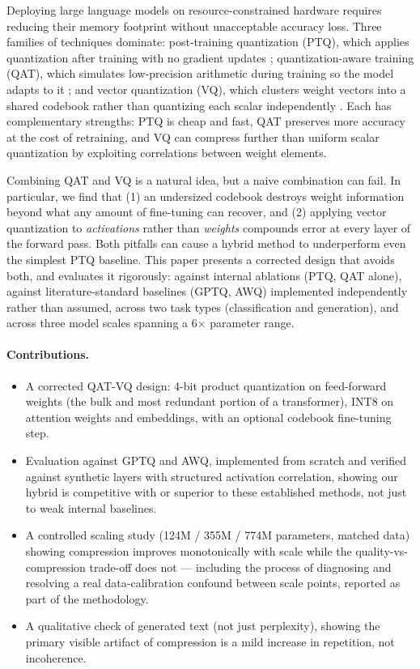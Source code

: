 \documentclass[11pt]{article}
\begin{document}
Deploying large language models on resource-constrained hardware requires
reducing their memory footprint without unacceptable accuracy loss. Three
families of techniques dominate: post-training quantization (PTQ), which
applies quantization after training with no gradient updates
\citep{dettmers2022bit8}; quantization-aware training (QAT), which
simulates low-precision arithmetic during training so the model adapts to
it \citep{zafrir2019q8bert}; and vector quantization (VQ), which clusters
weight vectors into a shared codebook rather than quantizing each scalar
independently \citep{gong2014compressing}. Each has complementary
strengths: PTQ is cheap and fast, QAT preserves more accuracy at the cost
of retraining, and VQ can compress further than uniform scalar
quantization by exploiting correlations between weight elements.

Combining QAT and VQ is a natural idea, but a naive combination can fail.
In particular, we find that (1) an undersized codebook destroys weight
information beyond what any amount of fine-tuning can recover, and (2)
applying vector quantization to \emph{activations} rather than
\emph{weights} compounds error at every layer of the forward pass. Both
pitfalls can cause a hybrid method to underperform even the simplest PTQ
baseline. This paper presents a corrected design that avoids both, and
evaluates it rigorously: against internal ablations (PTQ, QAT alone),
against literature-standard baselines (GPTQ, AWQ) implemented independently
rather than assumed, across two task types (classification and
generation), and across three model scales spanning a 6$\times$ parameter
range.

\paragraph{Contributions.}
\begin{itemize}
  \item A corrected QAT-VQ design: 4-bit product quantization on
    feed-forward weights (the bulk and most redundant portion of a
    transformer), INT8 on attention weights and embeddings, with an
    optional codebook fine-tuning step.
  \item Evaluation against GPTQ and AWQ, implemented from scratch and
    verified against synthetic layers with structured activation
    correlation, showing our hybrid is competitive with or superior to
    these established methods, not just to weak internal baselines.
  \item A controlled scaling study (124M / 355M / 774M parameters, matched
    data) showing compression improves monotonically with scale while the
    quality-vs-compression trade-off does not --- including the process of
    diagnosing and resolving a real data-calibration confound between
    scale points, reported as part of the methodology.
  \item A qualitative check of generated text (not just perplexity),
    showing the primary visible artifact of compression is a mild
    increase in repetition, not incoherence.
\end{itemize}
\end{document}
